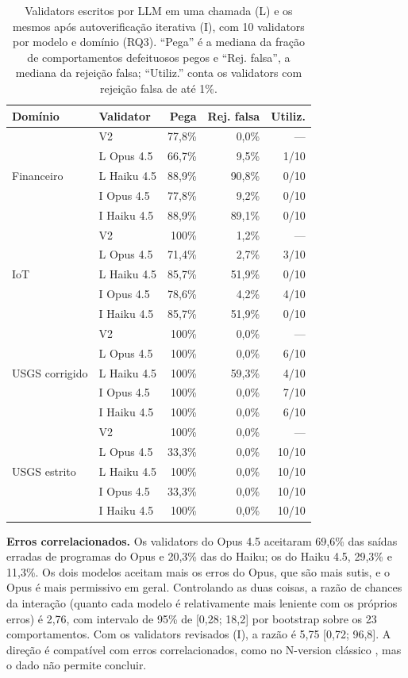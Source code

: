 \documentclass[sigconf,nonacm]{acmart}
\begin{document}
\begin{table}[t]
\caption{Validators escritos por LLM em uma chamada (L) e os mesmos após autoverificação iterativa (I), com 10 validators por modelo e domínio (RQ3). ``Pega'' é a mediana da fração de comportamentos defeituosos pegos e ``Rej. falsa'', a mediana da rejeição falsa; ``Utiliz.'' conta os validators com rejeição falsa de até 1\%.}
\label{tab:rq3}
\small
\begin{tabular}{llrrr}
\toprule
Domínio & Validator & Pega & Rej. falsa & Utiliz. \\
\midrule
\multirow{5}{*}{Financeiro} & V2 & 77,8\% & 0,0\% & --- \\
 & L Opus 4.5 & 66,7\% & 9,5\% & 1/10 \\
 & L Haiku 4.5 & 88,9\% & 90,8\% & 0/10 \\
 & I Opus 4.5 & 77,8\% & 9,2\% & 0/10 \\
 & I Haiku 4.5 & 88,9\% & 89,1\% & 0/10 \\
\midrule
\multirow{5}{*}{IoT} & V2 & 100\% & 1,2\% & --- \\
 & L Opus 4.5 & 71,4\% & 2,7\% & 3/10 \\
 & L Haiku 4.5 & 85,7\% & 51,9\% & 0/10 \\
 & I Opus 4.5 & 78,6\% & 4,2\% & 4/10 \\
 & I Haiku 4.5 & 85,7\% & 51,9\% & 0/10 \\
\midrule
\multirow{5}{*}{USGS corrigido} & V2 & 100\% & 0,0\% & --- \\
 & L Opus 4.5 & 100\% & 0,0\% & 6/10 \\
 & L Haiku 4.5 & 100\% & 59,3\% & 4/10 \\
 & I Opus 4.5 & 100\% & 0,0\% & 7/10 \\
 & I Haiku 4.5 & 100\% & 0,0\% & 6/10 \\
\midrule
\multirow{5}{*}{USGS estrito} & V2 & 100\% & 0,0\% & --- \\
 & L Opus 4.5 & 33,3\% & 0,0\% & 10/10 \\
 & L Haiku 4.5 & 100\% & 0,0\% & 10/10 \\
 & I Opus 4.5 & 33,3\% & 0,0\% & 10/10 \\
 & I Haiku 4.5 & 100\% & 0,0\% & 10/10 \\
\bottomrule
\end{tabular}
\end{table}

\textbf{Erros correlacionados.} Os validators do Opus 4.5 aceitaram 69,6\% das saídas erradas de programas do Opus e 20,3\% das do Haiku; os do Haiku 4.5, 29,3\% e 11,3\%. Os dois modelos aceitam mais os erros do Opus, que são mais sutis, e o Opus é mais permissivo em geral. Controlando as duas coisas, a razão de chances da interação (quanto cada modelo é relativamente mais leniente com os próprios erros) é 2,76, com intervalo de 95\% de [0,28; 18,2] por bootstrap sobre os 23 comportamentos. Com os validators revisados (I), a razão é 5,75 [0,72; 96,8]. A direção é compatível com erros correlacionados, como no N-version clássico \cite{knight1986experimental}, mas o dado não permite concluir.
\end{document}
